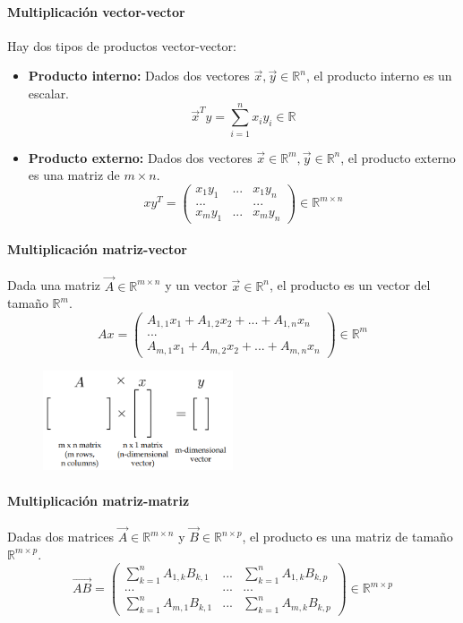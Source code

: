 \paragraph{Multiplicación vector-vector}
Hay dos tipos de productos vector-vector:
\begin{itemize}
\item \textbf{Producto interno:}
Dados dos vectores $\vec{x},\vec{y} \in \mathbb{R}^n$, el producto interno es un escalar.
$$\vec{x}^T y = \sum^n_{i=1} x_iy_i \in \mathbb{R} $$

\item \textbf{Producto externo:}
Dados dos vectores $\vec{x} \in \mathbb{R}^m, \vec{y} \in \mathbb{R}^n$, el producto externo es una matriz de $m \times n$.
$$xy^T = \begin{pmatrix}
x_1 y_1 & ... & x_1 y_n \\
...  & & ... \\
x_m y_1 & ... & x_m y_n
\end{pmatrix} \in \mathbb{R}^{m \times n}$$
\end{itemize}

\paragraph{Multiplicación matriz-vector} Dada una matriz $\vec{A} \in \mathbb{R}^{m \times n}$ y un vector $\vec{x} \in \mathbb{R}^n$, el producto es un vector del tamaño $\mathbb{R}^m$.
$$Ax = \begin{pmatrix}
A_{1,1}x_1 + A_{1,2}x_2 + ... + A_{1,n}x_n \\
... \\
A_{m,1}x_1 + A_{m,2}x_2 + ... + A_{m,n}x_n
\end{pmatrix} \in \mathbb{R}^m$$

\begin{figure}[h]
\centering
\includegraphics[width = 0.5\textwidth]{figs/matrix-vector-mult.png}
\end{figure}

\paragraph{Multiplicación matriz-matriz} Dadas dos matrices $\vec{A} \in \mathbb{R}^{m \times n}$ y $\vec{B} \in \mathbb{R}^{n \times p}$, el producto es una matriz de tamaño $\mathbb{R}^{m \times p}$.
$$\vec{AB} = \begin{pmatrix}
\sum^n_{k=1}A_{1,k}B_{k,1} & ... & \sum^n_{k=1}A_{1,k}B_{k,p} \\
... & ... & ...\\
\sum^n_{k=1}A_{m,1}B_{k,1} & ... & \sum^n_{k=1}A_{m,k}B_{k,p}
\end{pmatrix} \in \mathbb{R}^{m \times p}$$

